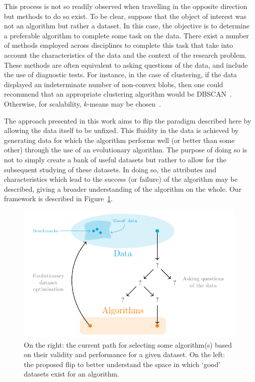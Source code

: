 \documentclass[smallextended]{svjour3}
\begin{document}
This process is not so readily observed when travelling in the opposite
direction but methods to do so exist. To be clear, suppose that the object of
interest was not an algorithm but rather a dataset. In this case, the objective
is to determine a preferable algorithm to complete some task on the data.
There exist a number of methods employed across disciplines to complete this
task that take into account the characteristics of the data and the context of
the research problem. These methods are often equivalent to asking questions of
the data, and include the use of diagnostic tests. For instance, in the case of
clustering, if the data displayed an indeterminate number of non-convex blobs,
then one could recommend that an appropriate clustering algorithm would be
DBSCAN~\cite{Ester1996}. Otherwise, for scalability, \(k\)-means may be
chosen~\cite{Wu2009,Zhao2009}.

The approach presented in this work aims to flip the paradigm described here by
allowing the data itself to be unfixed. This fluidity in the data is achieved by
generating data for which the algorithm performs well (or better than some
other) through the use of an evolutionary algorithm. The purpose of doing so is
not to simply create a bank of useful datasets but rather to allow for the
subsequent studying of these datasets. In doing so, the attributes and
characteristics which lead to the success (or failure) of the algorithm may be
described, giving a broader understanding of the algorithm on the whole. Our
framework is described in Figure~\ref{fig:paradigm}.

\begin{figure}[htbp]
    \centering
    \includegraphics{Fig1.pdf}
    \caption{%
        On the right: the current path for selecting some algorithm(s) based on
        their validity and performance for a given dataset. On the left: the
        proposed flip to better understand the space in which `good' datasets
        exist for an algorithm.
    }\label{fig:paradigm}
\end{figure}
\end{document}
